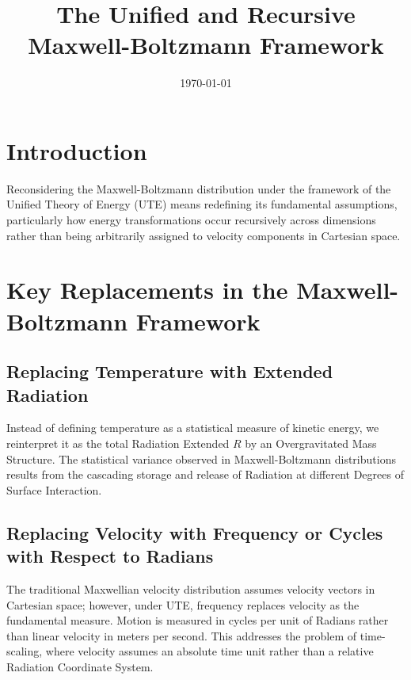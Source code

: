 \documentclass{article}
\title{The Unified and Recursive Maxwell-Boltzmann Framework}
\author{}
\date{\today}
\begin{document}
\maketitle

\section{Introduction}

Reconsidering the Maxwell-Boltzmann distribution under the framework of the Unified Theory of Energy (UTE) means redefining its fundamental assumptions, particularly how energy transformations occur recursively across dimensions rather than being arbitrarily assigned to velocity components in Cartesian space.

\section{Key Replacements in the Maxwell-Boltzmann Framework}

\subsection{Replacing Temperature with Extended Radiation}
Instead of defining temperature as a statistical measure of kinetic energy, we reinterpret it as the total Radiation Extended \( R \) by an Overgravitated Mass Structure. The statistical variance observed in Maxwell-Boltzmann distributions results from the cascading storage and release of Radiation at different Degrees of Surface Interaction.

\subsection{Replacing Velocity with Frequency or Cycles with Respect to Radians}
The traditional Maxwellian velocity distribution assumes velocity vectors in Cartesian space; however, under UTE, frequency replaces velocity as the fundamental measure. Motion is measured in cycles per unit of Radians rather than linear velocity in meters per second. This addresses the problem of time-scaling, where velocity assumes an absolute time unit rather than a relative Radiation Coordinate System.
\end{document}
